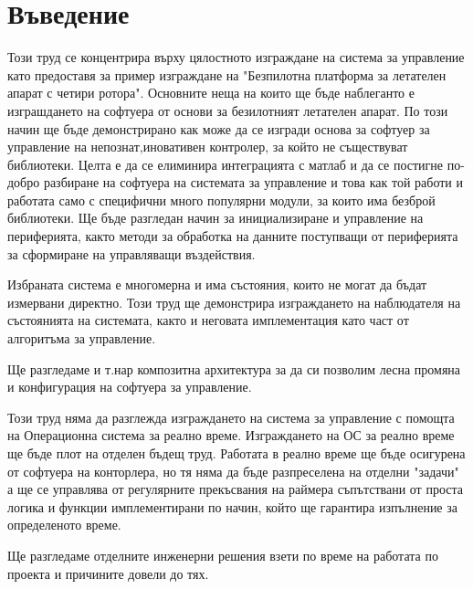 \section{Въведение}  


Този труд се концентрира върху цялостното изграждане на система за управление като предоставя
за пример изграждане на "Безпилотна платформа за летателен апарат с четири ротора".
Основните неща на които ще бъде наблеганто е изграшдането на софтуера от основи за безилотният летателен апарат.
По този начин ще бъде демонстрирано как може да се изгради основа за софтуер за управление на непознат,иновативен контролер, за който не съществуват библиотеки. 
Целта е да се елиминира интеграцията с матлаб и да се постигне по-добро разбиране на софтуера на системата за управление и това как той работи и работата само с специфични много популярни модули, за които има безброй библиотеки. Ще бъде разгледан начин за инициализиране и управление на периферията, както методи за обработка на данните поступващи от периферията за сформиране на управляващи въздействия.

Избраната система е многомерна и има състояния, които не могат да бъдат измервани директно.
Този труд ще демонстрира изграждането на наблюдателя на състоянията на системата, както и неговата имплементация като част от алгоритъма за управление. 

Ще разгледаме и т.нар композитна архитектура за да си позволим лесна промяна и конфигурация на софтуера за управление.

Този труд няма да разглежда изграждането на система за управление с помощта на Операционна система за реално време. Изграждането на ОС за реално време ще бъде плот на отделен бъдещ труд.
Работата в реално време ще бъде осигурена от софтуера на конторлера, но тя няма да бъде разпреселена на отделни "задачи" а ще се управлява от регулярните прекъсвания на раймера съпътствани от проста логика и функции имплементирани по начин, който ще гарантира изпълнение за определеното време.


Ще разгледаме отделните инженерни решения взети по време на работата по проекта и причините довели до тях.
